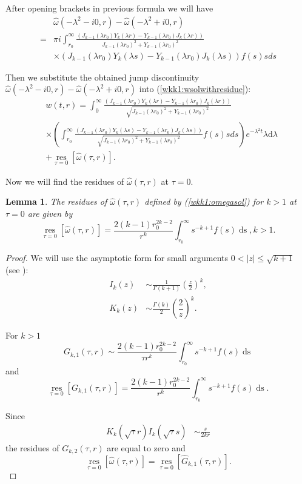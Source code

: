 \documentclass[manuscript, printscheme]{paper}
\newtheorem{lem}[thm]{Lemma}
\newcommand{\ds}{\operatorname{ds}}
\begin{document}
After opening brackets in previous formula we will have
\begin{align*}&\hat \omega(-\lambda^2-i0,r) - \hat \omega(-\lambda^2+i0,r)\\
=&\pi i \int_{r_0}^\infty  \frac{ \left (J_{k-1}(\lambda r_0) Y_k(\lambda r) - Y_{k-1}(\lambda r_0) J_k(\lambda r) \right )
 } {J_{k-1}(\lambda r_0)^2 + Y_{k-1}(\lambda r_0)^2} \\
&\times \left ( J_{k-1}(\lambda r_0) Y_k(\lambda s) - Y_{k-1}(\lambda r_0) J_k(\lambda s) \right )  f(s) s ds 
\end{align*}

Then we substitute the obtained jump discontinuity $\hat \omega(-\lambda^2-i0,r) - \hat \omega(-\lambda^2+i0,r)$ into (\ref{wkk1:wsolwithresidue}):
\begin{align*}
&w(t,r) = \nonumber 
 \int_0^\infty  \frac{ \left (J_{k-1}(\lambda r_0) Y_k(\lambda r) - Y_{k-1}(\lambda r_0) J_k(\lambda r) \right ) } 
{\sqrt{J_{k-1}(\lambda r_0)^2 + Y_{k-1}(\lambda r_0)^2}} \\ 
& \times \left ( \int_{r_0}^\infty \frac{ \left (J_{k-1}(\lambda r_0) Y_k(\lambda s) - Y_{k-1}(\lambda r_0) J_k(\lambda s) \right ) } 
{\sqrt{J_{k-1}(\lambda r_0)^2 + Y_{k-1}(\lambda r_0)^2}}  f(s) s ds \right )  e^{-\lambda^2 t} \lambda \mathrm{d}\lambda 
\\
&+ \operatorname{res}\limits_{\tau=0}[\hat \omega(\tau,r)]. 
\end{align*}

Now we will find the residues of $\hat \omega(\tau,r)$ at $\tau=0$. 

\begin{lem} The residues of $\hat \omega(\tau,r)$ defined by (\ref{wkk1:omegasol}) for $k>1$ at $\tau=0$  are given by
$$\operatorname{res}\limits_{\tau=0}[\hat \omega(\tau,r)] = \frac {2(k-1) r_0^{2k-2}} {r^{k}} \int_{r_0}^\infty s^{-k+1} f(s) \ds,k>1.
$$ 
\end{lem}

\begin{proof}We will use the asymptotic form for small arguments $0 < |z| \leq \sqrt{k+1}$ (see \cite{BE}):
\begin{align*}
 I_{k }(z) & \sim {\frac {1}{\Gamma (k +1)}}\left({\frac {z}{2}}\right)^{k },\\K_{k }(z)&\sim {\frac {\Gamma (k )}{2}}\left({\dfrac {2}{z}}\right)^{k }.
\end{align*}

For $k>1$ 
$$
G_{k,1}(\tau,r) \sim  \frac {2(k-1) r_0^{2k-2}} {\tau r^k} \int_{r_0}^\infty s^{-k+1} f(s) \ds
$$
and
$$
\operatorname{res}\limits_{\tau=0}[G_{k,1}(\tau,r)]  = \frac {2(k-1) r_0^{2k-2}} {r^k} \int_{r_0}^\infty s^{-k+1} f(s) \ds.
$$

Since
\begin{align*}
K_{k }(\sqrt \tau r)I_{k }(\sqrt \tau s)&\sim \frac s{2kr}
\end{align*}
the residues of $G_{k,2}(\tau,r)$ are equal to zero and 
$$\operatorname{res}\limits_{\tau=0}[\hat \omega(\tau,r)] = \operatorname{res}\limits_{\tau=0}[\hat G_{k,1}(\tau,r)].$$ 
\end{proof}
\end{document}
